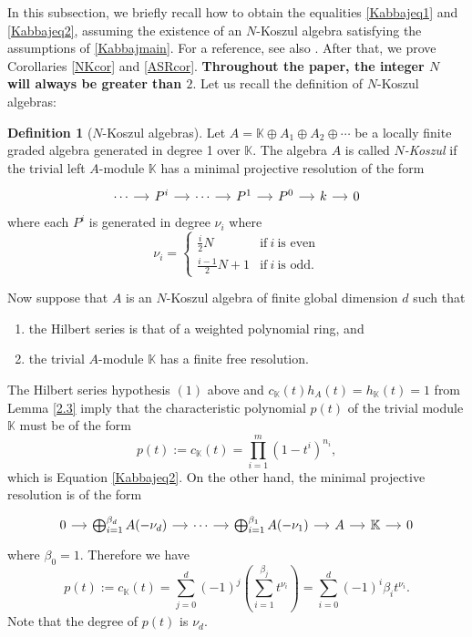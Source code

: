 \documentclass[reqno]{amsart}
\newcommand{\bbK}{\mathbb{K}}
\numberwithin{equation}{section}
\theoremstyle{plain}
\theoremstyle{definition}
\newtheorem{de}[equation]{Definition}
\begin{document}
In this subsection, we briefly recall how to obtain the equalities \ref{Kabbajeq1} and \ref{Kabbajeq2}, assuming the existence of an $N$-Koszul algebra satisfying the assumptions of \ref{Kabbajmain}. For a reference, see also \cite{Kabbaj}. After that, we prove Corollaries \ref{NKcor} and \ref{ASRcor}. \textbf{Throughout the paper, the integer $N$ will always be greater than $2.$} Let us recall the definition of $N$-Koszul algebras:

\begin{de}[$N$-Koszul algebras]\cite[Definition 2.10]{Berger}
    Let $A=\bbK\oplus A_1\oplus A_2\oplus\cdots$ be a locally finite graded algebra generated in degree 1 over $\bbK$. The algebra $A$ is called \emph{$N$-Koszul} if the trivial left $A$-module $\bbK$ has a minimal projective resolution of the form
\[\begin{tikzcd}[column sep=small]
	\cdots & {P^i} & \cdots & {P^1} & {P^0} & k & 0
	\arrow[from=1-1, to=1-2]
	\arrow[from=1-2, to=1-3]
	\arrow[from=1-3, to=1-4]
	\arrow[from=1-4, to=1-5]
	\arrow[from=1-5, to=1-6]
	\arrow[from=1-6, to=1-7]
\end{tikzcd}\]
    where each $P^i$ is generated in degree $\nu_i$ where
    $$\nu_i=\left\{\begin{array}{llll}
        \frac{i}{2}N & \text{if}\ i\ \text{is even}\\
        \frac{i-1}{2}N+1 & \text{if}\ i\ \text{is odd}.
        \end{array}\right.$$
\end{de}

Now suppose that $A$ is an $N$-Koszul algebra of finite global dimension $d$ such that
\begin{enumerate}
    \item the Hilbert series is that of a weighted polynomial ring, and
    \item the trivial $A$-module $\bbK$ has a finite free resolution.
\end{enumerate}
The Hilbert series hypothesis $(1)$ above and $c_\bbK(t)h_A(t)=h_\bbK(t)=1$ from Lemma \ref{2.3} imply that the characteristic polynomial $p(t)$ of the trivial module $\bbK$ must be of the form
$$p(t):=c_\bbK(t)=\prod_{i=1}^m(1-t^i)^{n_i},$$
which is Equation \ref{Kabbajeq2}.
On the other hand, the minimal projective resolution is of the form 
\[\begin{tikzcd}[column sep=small]
	0 & {\bigoplus^{\beta_d}_{i=1}A(-\nu_d)} & \cdots & {\bigoplus^{\beta_1}_{i=1}A(-\nu_1)} & A & \bbK & 0
	\arrow[from=1-1, to=1-2]
	\arrow[from=1-2, to=1-3]
	\arrow[from=1-3, to=1-4]
	\arrow[from=1-4, to=1-5]
	\arrow[from=1-5, to=1-6]
	\arrow[from=1-6, to=1-7]
\end{tikzcd}\]
where $\beta_0=1.$ Therefore we have
$$p(t):=c_\bbK(t)=\sum^d_{j=0}(-1)^j\left(\sum^{\beta_j}_{i=1}t^{\nu_i}\right)=\sum^d_{i=0}(-1)^i\beta_it^{\nu_i}.$$
Note that the degree of $p(t)$ is $\nu_d$. 
\end{document}
